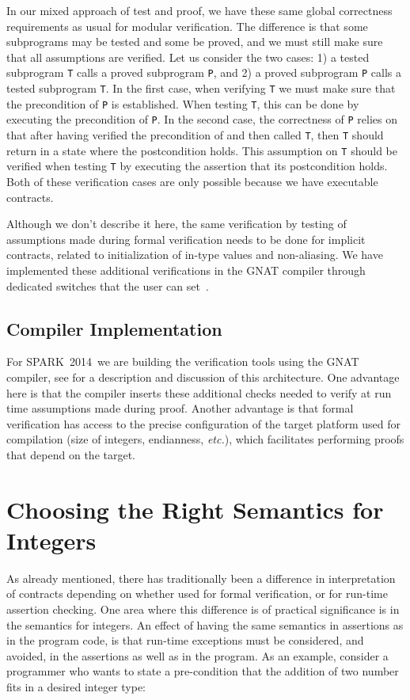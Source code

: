 \documentclass[sttt,final]{svjour}
\newcommand{\newspark}{SPARK~2014\xspace}
\newcommand{\etc}{\textit{etc.}\xspace}
\begin{document}
In our mixed approach of test and proof, we have these same global
correctness requirements as usual for modular verification. The
difference is that some subprograms may be tested and some be proved,
and we must still make sure that all assumptions are verified. Let us
consider the two cases: 1) a tested subprogram \verb|T| calls a proved
subprogram \verb|P|, and 2) a proved subprogram \verb|P| calls a
tested subprogram \verb|T|. In the first case, when verifying \verb|T|
we must make sure that the precondition of \verb|P| is
established. When testing \verb|T|, this can be done by executing the
precondition of \verb|P|. In the second case, the correctness of
\verb|P| relies on that after having verified the precondition of and
then called \verb|T|, then \verb|T| should return in a state where the
postcondition holds. This assumption on \verb|T| should be verified
when testing \verb|T| by executing the assertion that its postcondition
holds. Both of these verification cases are only possible because we
have executable contracts.

Although we don't describe it here, the same verification by testing of
assumptions made during formal verification needs to be done for implicit
contracts, related to initialization of in-type values and non-aliasing. We
have implemented these additional verifications in the GNAT compiler through
dedicated switches that the user can set~\cite{hiliteERTS2012}.

\subsection{Compiler Implementation}
For \newspark\ we are building the verification tools using the GNAT compiler,
see \cite{ksd2012} for a description and discussion of this architecture. One
advantage here is that the compiler inserts these additional checks needed to
verify at run time assumptions made during proof. Another advantage is that
formal verification has access to the precise configuration of the target
platform used for compilation (size of integers, endianness, \etc), which
facilitates performing proofs that depend on the target.

\section{Choosing the Right Semantics for Integers}
\label{overflowsemantics}
As already mentioned, there has traditionally been a difference in
interpretation of contracts depending on whether used for formal
verification, or for run-time assertion checking. One area where this
difference is of practical significance is in the semantics for
integers. An effect of having the same semantics in assertions as in
the program code, is that run-time exceptions must be considered, and
avoided, in the assertions as well as in the program. As an example,
consider a programmer who wants to state a pre-condition that the
addition of two number fits in a desired integer type:
\end{document}
